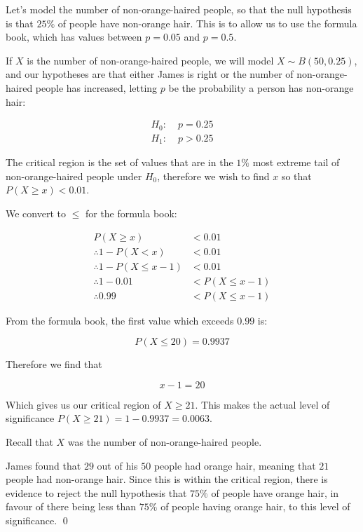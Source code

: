 \begin{solution}
    Let's model the number of non-orange-haired people, so that the null hypothesis is that $25\%$ of people have non-orange hair. This is to allow us to use the formula book, which has values between $p=0.05$ and $p=0.5$.

    If $X$ is the number of non-orange-haired people, we will model $X \sim B(50,0.25)$, and our hypotheses are that either James is right or the number of non-orange-haired people has increased, letting $p$ be the probability a person has non-orange hair:

    \begin{align*}
        H_0: \; &p=0.25 \\
        H_1: \; &p>0.25
    \end{align*}

    The critical region is the set of values that are in the $1\%$ most extreme tail of non-orange-haired people under $H_0$, therefore we wish to find $x$ so that $P(X\geq x)<0.01$.

    We convert to $\leq$ for the formula book:

    \begin{align*}
        P(X\geq x) &<0.01 \\
        \therefore 1 - P(X<x) &< 0.01 \\
        \therefore 1 - P(X\leq x-1) &< 0.01 \\
        \therefore 1-0.01 &< P(X\leq x-1)\\
        \therefore 0.99 &< P(X\leq x-1)
    \end{align*}

    From the formula book, the first value which exceeds $0.99$ is:

    \[P(X\leq20) = 0.9937\]

    Therefore we find that 

    \[x-1 = 20\]

    Which gives us our critical region of $X\geq21$. This makes the actual level of significance $P(X\geq 21)=1- 0.9937 = 0.0063$.
    
    Recall that $X$ was the number of non-orange-haired people.

    James found that $29$ out of his $50$ people had orange hair, meaning that $21$ people had non-orange hair. Since this is within the critical region, there is evidence to reject the null hypothesis that $75\%$ of people have orange hair, in favour of there being less than $75\%$ of people having orange hair, to this level of significance.
    \qed
\end{solution}




